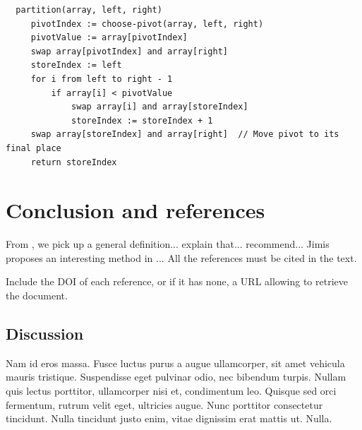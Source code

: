 \documentclass[jimisdraft]{jimis-en}
\begin{document}
\begin{listing}
  \begin{lstlisting}
  partition(array, left, right)
     pivotIndex := choose-pivot(array, left, right)
     pivotValue := array[pivotIndex]
     swap array[pivotIndex] and array[right]
     storeIndex := left
     for i from left to right - 1
         if array[i] < pivotValue
             swap array[i] and array[storeIndex]
             storeIndex := storeIndex + 1
     swap array[storeIndex] and array[right]  // Move pivot to its final place
     return storeIndex
  \end{lstlisting}
  \caption{Partition function of quicksort algorithm.}
  \label{lst:example}
\end{listing}





\section{Conclusion and references}
From \citet{sinclair91corpus}, we pick up a general definition... \citet{ounis00flidar} explain that... \citet{wood92artifacts} recommend... Jimis proposes an interesting method in \citet{jimis}... All the references must be cited in the text.

Include the DOI of each reference, or if it has none, a URL allowing to retrieve the document.

\nocite{hentschel07acceptance,biodiversa,pubmed,antonymy02perspective,justeson01cooccurence,r-project,perotti2015,petrone:hal-01191886}


\subsection{Discussion}
Nam id eros massa. Fusce luctus purus a augue ullamcorper, sit amet vehicula mauris tristique. Suspendisse eget pulvinar odio, nec bibendum turpis. Nullam quis lectus porttitor, ullamcorper nisi et, condimentum leo. Quisque sed orci fermentum, rutrum velit eget, ultricies augue. Nunc porttitor consectetur tincidunt. Nulla tincidunt justo enim, vitae dignissim erat mattis ut. Nulla.


\end{document}

